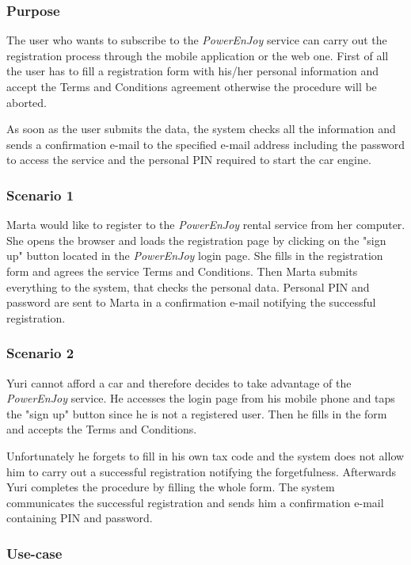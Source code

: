\subsubsection{Purpose}
The user who wants to subscribe to the \emph{PowerEnJoy} service can carry out the registration process through the mobile application or the web one. First of all the user has to fill a registration form with his/her personal information and accept the Terms and Conditions agreement otherwise the procedure will be aborted.

As soon as the user submits the data, the system checks all the information and sends a confirmation e-mail to the specified e-mail address including the password to access the service and the personal PIN required to start the car engine.

\subsubsection{Scenario 1}
Marta would like to register to the \emph{PowerEnJoy} rental service from her computer. She opens the browser and loads the registration page by clicking on the "sign up" button located in the \emph{PowerEnJoy} login page. She fills in the registration form and agrees the service Terms and Conditions. Then Marta submits everything to the system, that checks the personal data. Personal PIN and password are sent to Marta in a confirmation e-mail notifying the successful registration.

\subsubsection{Scenario 2}
Yuri cannot afford a car and therefore decides to take advantage of the \emph{PowerEnJoy} service. He accesses the login page from his mobile phone and taps the "sign up" button since he is not a registered user. Then he fills in the form and accepts the Terms and Conditions.

Unfortunately he forgets to fill in his own tax code and the system does not allow him to carry out a successful registration notifying the forgetfulness. Afterwards Yuri completes the procedure by filling the whole form. The system communicates the successful registration and sends him a confirmation e-mail containing PIN and password.

\subsubsection{Use-case}

